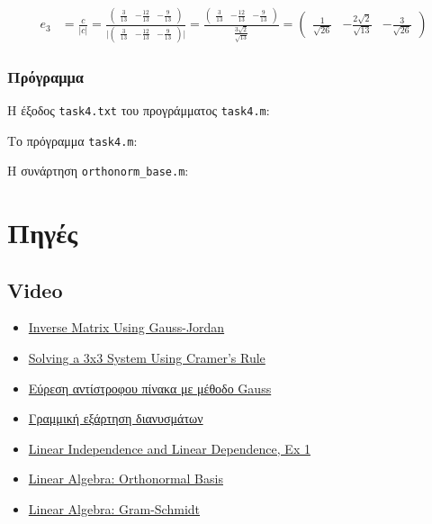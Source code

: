 \documentclass[12pt, fleqn, leqno]{extreport}
\begin{document}
\begin{equation}
    \begin{split}
        e_{3} &= \frac{c}{\vert c \vert} =
        \frac{
            \begin{pmatrix}
                \frac{3}{13} & -\frac{12}{13} & -\frac{9}{13}
            \end{pmatrix}
        }{
            \vert
            \begin{pmatrix}
                \frac{3}{13} & -\frac{12}{13} & -\frac{9}{13}
            \end{pmatrix}
            \vert
        } =
        \frac{
            \begin{pmatrix}
                \frac{3}{13} & -\frac{12}{13} & -\frac{9}{13}
            \end{pmatrix}
        }{
            \frac{3\sqrt{2}}{\sqrt{13}}
        } =
        \begin{pmatrix}
            \frac{1}{\sqrt{26}} & -\frac{2\sqrt{2}}{\sqrt{13}} & -\frac{3}{\sqrt{26}}
        \end{pmatrix}
    \end{split}
\end{equation}

\newpage
\subsection{Πρόγραμμα}

Η έξοδος \lstinline[language={}]{task4.txt} του προγράμματος \lstinline[language={}]{task4.m}:


Το πρόγραμμα \lstinline[language={}]{task4.m}:


Η συνάρτηση \lstinline[language={}]{orthonorm_base.m}:


\chapter{Πηγές}
\newpage

\section{Video}
\begin{itemize}
    \item \href{https://www.youtube.com/watch?v=cJg2AuSFdjw}{Inverse Matrix Using Gauss-Jordan}
    \item \href{https://youtu.be/X5rDjbp0t6s}{Solving a 3x3 System Using Cramer's Rule}
    \item \href{https://youtu.be/0vB1sgebS9c}{Εύρεση αντίστροφου πίνακα με μέθοδο Gauss}
    \item \href{https://youtu.be/Gmt1fmlrEto}{Γραμμική εξάρτηση διανυσμάτων}
    \item \href{https://youtu.be/yLi8RxqfowA}{Linear Independence and Linear Dependence, Ex 1}
    \item \href{https://www.youtube.com/watch?v=ZJu26chXEiw}{Linear Algebra: Orthonormal Basis}
    \item \href{https://www.youtube.com/watch?v=Aslf3KGq2UE}{Linear Algebra: Gram-Schmidt}
\end{itemize}
\end{document}
